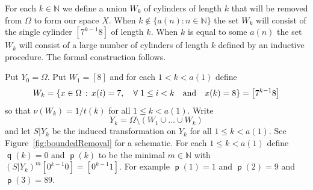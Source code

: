 \documentclass[10pt]{amsart}
\theoremstyle{definition}\newtheorem{defi}[theo]{Definition}\newtheorem{rema}[theo]{Remark}\newtheorem{exam}[theo]{Example}\newtheorem{exem}[theo]{Example}\newtheorem{nota}[theo]{Notation}
\DeclareMathOperator{\p}{\mathsf{p}}
\DeclareMathOperator{\q}{\mathsf{q}}
\newcommand{\N}{\mathbb{N}}
\let\originalleft\left
\let\originalright\right
\renewcommand{\left}{\mathopen{}\mathclose\bgroup\originalleft}
\renewcommand{\right}{\aftergroup\egroup\originalright}
\let\oldforall\forall
\renewcommand*{\forall}{\mathrel{\oldforall}}
\begin{document}
For each $k \in \N$ we define a union $W_k$ of cylinders of length $k$ that will be removed from $\Omega$ to form our space $X$. When $k \notin \{ a(n) : n \in \N \}$ the set $W_k$ will consist of the single cylinder $[7^{k-1}8]$ of length $k$. When $k$ is equal to some $a(n)$ the set $W_k$ will consist of a large number of cylinders of length $k$ defined by an inductive procedure. The formal construction follows.

Put $Y_0 = \Omega$. Put $W_1 = [8]$ and for each $1 < k < a(1)$ define
\[
W_k =
\left\{ x \in \Omega\,:\, x(i) = 7, \quad\forall 1 \le i < k \quad\text{and}\quad x(k) = 8 \right\} = \left[7^{k-1}8\right]
\]
so that $\nu(W_k) = 1/t(k)$ for all $1 \le k < a(1)$. Write
\[
Y_k = \Omega \setminus (W_1 \cup \dots \cup W_k)
\]
and let $S|Y_k$ be the induced transformation on $Y_k$ for all $1 \le k < a(1)$. See Figure~\ref{fig:boundedRemoval} for a schematic. For each $1 \le k < a(1)$ define $\q(k) = 0$ and $\p(k)$ to be the minimal $m \in \N$ with $(S|Y_k)^m [0^{k-1}0] = [0^{k-1}1]$. For example $\p(1) = 1$ and $\p(2) = 9$ and $\p(3) = 89$.
\end{document}
